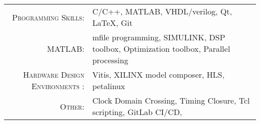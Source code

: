 
\begin{tabular}{>{}r>{}p{13cm}}
	\textsc{Programming Skills:}            & C/C++, MATLAB, VHDL/verilog, Qt, \LaTeX,   Git                                      \\
	\textsc{MATLAB:}                        & mfile programming, SIMULINK, DSP toolbox, Optimization toolbox, Parallel processing \\
	\textsc{Hardware Design Environments :} & Vitis, XILINX model composer, HLS, petalinux                                        \\
	\textsc{Other:}                         & Clock Domain Crossing, Timing Closure, Tcl scripting, GitLab CI/CD,
\end{tabular}